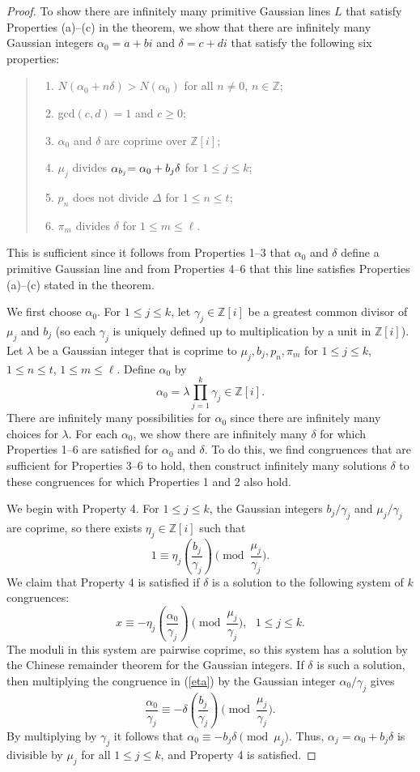 \documentclass[11pt]{article}
\newcommand{\Z}{\mathbb{Z}}
\newcommand{\ao}{\alpha_0}
\newcommand{\zi}{\Z[i]}
\newcommand{\be}{\begin{equation}}
\newcommand{\ee}{\end{equation}}
\begin{document}
\begin{proof}  
To show there are infinitely many primitive Gaussian lines $L$ that satisfy Properties (a)--(c) in the theorem, we show that there are infinitely many Gaussian integers
 $\alpha_0=a+bi$ and $\delta=c+di$ that satisfy the following six properties:
\begin{quote} \begin{enumerate}
 \item $N(\ao+n\delta)>N(\ao)$ for all $n\neq 0$, $n\in\Z$;
 \item gcd$(c,d)=1$ and $c\geq 0$;
  \item $\alpha_0$ and $\delta$ are coprime over $\zi$;
  \item $\mu_j $ divides  $ \alpha_{b_j}\hskip-.035in=\ao+b_j\delta$  for  $1 \leq j\leq k$;
   \item $p_n $ does not divide  $\Delta$  for $1 \leq n\leq t$;
    \item $\pi_m $ divides  $\delta$  for $1 \leq m\leq \ell$.
 \end{enumerate}
\end{quote}
This is sufficient since it follows from Properties 1--3 that $\alpha_0$ and $\delta$ define a primitive Gaussian line and from Properties 4--6 that this line satisfies Properties (a)--(c) stated in the theorem.

We first choose $\ao$. For $1 \leq j\leq k$, let $\gamma_j\in\Z[i]$ be a greatest common divisor of $\mu_j$ and $b_j$ (so each $\gamma_j$ is uniquely defined up to multiplication by a unit in $\zi$). Let $\lambda$ be a Gaussian integer that is coprime to $\mu_j, b_j, p_n, \pi_m$ for $1\leq j\leq k$, $1 \leq n\leq t$, $1 \leq m\leq \ell$.
Define $\ao$ by 
$$\alpha_0=\lambda\prod_{j=1}^k \gamma_j\in\zi.$$
There are infinitely many possibilities for $\alpha_0$ since there are infinitely many choices for $\lambda$. For each $\alpha_0$, we show there are infinitely many $\delta$ 
for which Properties 1--6 are satisfied for $\ao$ and $\delta$. To do this, we find congruences that are sufficient for Properties 3--6 to hold, then construct infinitely many solutions $\delta$ to these congruences for which Properties 1 and 2 also hold. 

We begin with Property 4. For $1 \leq j\leq k$, the Gaussian  integers $b_j/\gamma_j$ and $\mu_j/\gamma_j$ are coprime, so there exists  $\eta_j\in\Z[i]$ such that
\be\label{eta}1\equiv\eta_j\left(\frac{b_j}{\gamma_j}\right)\pmod{\frac{\mu_j}{\gamma_j}}.\ee
We claim that  Property 4 is satisfied if $\delta$ is a solution to the following system of $k$ congruences:
\be\label{P4}x\equiv -\eta_j\left(\frac{\ao}{\gamma_j}\right)\pmod{\frac{\mu_j}{\gamma_j}}, \ \ \ 1 \leq j\leq k.\ee
The moduli in this system are pairwise coprime, so this system has a solution by the Chinese remainder theorem for the Gaussian integers. If 
 $\delta$ is such  a solution, then
multiplying the congruence in (\ref{eta}) by the Gaussian integer $\alpha_0/\gamma_j$ gives
$$\frac{\alpha_0}{\gamma_j}\equiv -\delta\left(\frac{b_j}{\gamma_j}\right)\pmod{\frac{\mu_j}{\gamma_j}}.$$
By multiplying  by $\gamma_j$  it follows that $\alpha_0\equiv -b_j\delta\pmod{\mu_j}$.
Thus,  $\alpha_j=\alpha_0+b_j\delta$ is divisible by $\mu_j$
for all $1\leq j\leq k$, and Property 4 is satisfied.


\end{proof}
\end{document}
